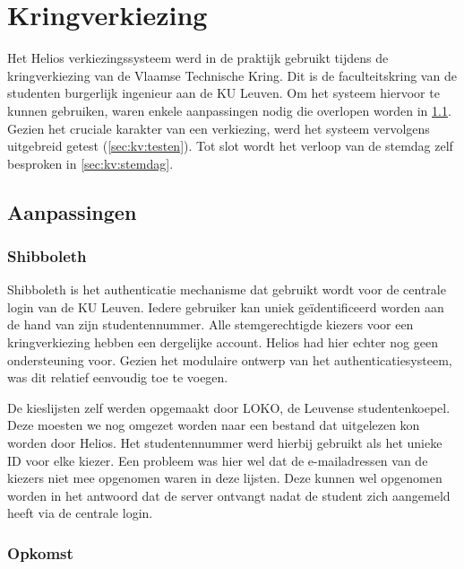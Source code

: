 % 
%

\chapter{Kringverkiezing}
\label{chap:kringverkiezing}

Het Helios verkiezingssysteem werd in de praktijk gebruikt tijdens de kringverkiezing van de Vlaamse Technische Kring. Dit is de faculteitskring van de studenten burgerlijk ingenieur aan de KU Leuven. Om het systeem hiervoor te kunnen gebruiken, waren enkele aanpassingen nodig die overlopen worden in \ref{sec:kv:aanpassingen}. Gezien het cruciale karakter van een verkiezing, werd het systeem vervolgens uitgebreid getest (\ref{sec:kv:testen}). Tot slot wordt het verloop van de stemdag zelf besproken in \ref{sec:kv:stemdag}.

\section{Aanpassingen}
\label{sec:kv:aanpassingen}

\subsection{Shibboleth}

Shibboleth is het authenticatie mechanisme dat gebruikt wordt voor de centrale login van de KU Leuven. Iedere gebruiker kan uniek ge\"identificeerd worden aan de hand van zijn studentennummer. Alle stemgerechtigde kiezers voor een kringverkiezing hebben een dergelijke account. Helios had hier echter nog geen ondersteuning voor. Gezien het modulaire ontwerp van het authenticatiesysteem, was dit relatief eenvoudig toe te voegen.


\npar De kieslijsten zelf werden opgemaakt door LOKO, de Leuvense studentenkoepel. Deze moesten we nog omgezet worden naar een bestand dat uitgelezen kon worden door Helios. Het studentennummer werd hierbij gebruikt als het unieke ID voor elke kiezer. Een probleem was hier wel dat de e-mailadressen van de kiezers niet mee opgenomen waren in deze lijsten. Deze kunnen wel opgenomen worden in het antwoord dat de server ontvangt nadat de student zich aangemeld heeft via de centrale login.

\subsection{Opkomst}

